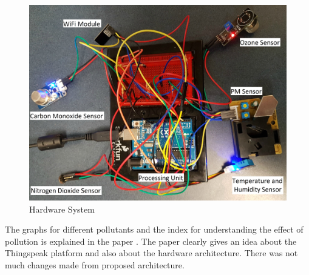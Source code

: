 \documentclass[11pt]{article}
\begin{document}
\begin{figure}[h!]
  \centering
  \hspace*{-1.25cm}   
\includegraphics[scale=0.094]{images/fig4.jpg}
  \hspace*{-1.25cm}
  \caption{Hardware System}
  \label{arch}
\end{figure}

The graphs for different pollutants and the index for understanding the effect of pollution is explained in the paper \cite {SA17}. The paper clearly gives an idea about the Thingspeak platform and also about the hardware architecture. There was not much changes made from proposed architecture.




\newpage
\end{document}
